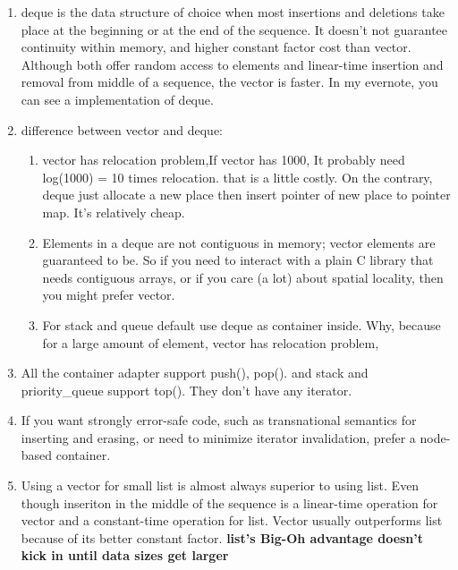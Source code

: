 \documentclass[a4paper,11pt,twoside]{book}
\begin{document}
\begin{itemize}
\begin{enumerate}
\item deque is the data structure of choice when most insertions and deletions take place at the beginning or at the end of the sequence. It doesn't not guarantee continuity within memory, and higher constant factor cost than vector. Although both offer random access to elements and linear-time insertion and removal from middle of a sequence, the vector is faster.  In my evernote, you can see a implementation of deque.

\item difference between vector and deque:
\begin{enumerate}
\item vector has relocation problem,If vector has 1000, It probably need log(1000) = 10 times relocation. that is a little costly. On the contrary, deque just allocate a new place then insert pointer of new place to pointer map. It's relatively cheap.


\item Elements in a deque are not contiguous in memory; vector elements are guaranteed to be. So if you need to interact with a plain C library that needs contiguous arrays, or if you care (a lot) about spatial locality, then you might prefer vector.

\item For stack and queue default use deque as container inside. Why, because for a large amount of element, vector has relocation problem,
\end{enumerate}


\item All the container adapter support push(), pop(). and stack and priority\_queue support top(). They don't have any iterator.

\item If you want strongly error-safe code, such as transnational semantics for inserting and erasing, or need to minimize iterator invalidation, prefer a node-based container.

\item Using a vector for small list is almost always superior to using list. Even though inseriton in the middle of the sequence is a linear-time operation for vector and a constant-time operation for list. Vector usually outperforms list because of its better constant factor. \textbf{list's Big-Oh advantage doesn't kick in until data sizes get larger}


\end{enumerate}
\end{itemize}
\end{document}
